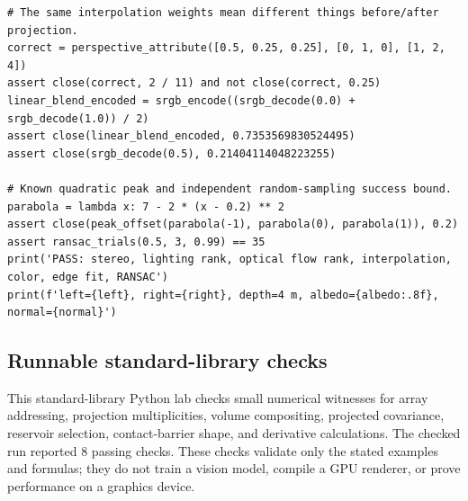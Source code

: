 \begin{verbatim}
# The same interpolation weights mean different things before/after projection.
correct = perspective_attribute([0.5, 0.25, 0.25], [0, 1, 0], [1, 2, 4])
assert close(correct, 2 / 11) and not close(correct, 0.25)
linear_blend_encoded = srgb_encode((srgb_decode(0.0) + srgb_decode(1.0)) / 2)
assert close(linear_blend_encoded, 0.7353569830524495)
assert close(srgb_decode(0.5), 0.21404114048223255)

# Known quadratic peak and independent random-sampling success bound.
parabola = lambda x: 7 - 2 * (x - 0.2) ** 2
assert close(peak_offset(parabola(-1), parabola(0), parabola(1)), 0.2)
assert ransac_trials(0.5, 3, 0.99) == 35
print('PASS: stereo, lighting rank, optical flow rank, interpolation, color, edge fit, RANSAC')
print(f'left={left}, right={right}, depth=4 m, albedo={albedo:.8f}, normal={normal}')
\end{verbatim}

\subsection{Runnable standard-library checks}\label{04-visual-computing-ii-ch034-runnable-standard-library-checks}

\hypertarget{04-visual-computing-ii-ch034-runnable-standard-library-checks}{}

This standard-library Python lab checks small numerical witnesses for array addressing, projection multiplicities, volume compositing, projected covariance, reservoir selection, contact-barrier shape, and derivative calculations. The checked run reported 8 passing checks. These checks validate only the stated examples and formulas; they do not train a vision model, compile a GPU renderer, or prove performance on a graphics device.

